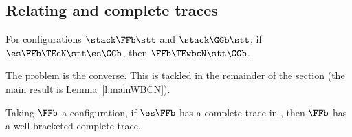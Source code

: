 \subsection{Relating \WBOGS and \AOGS complete traces}
\label{ss:main_wbct}

\ifcutLMCS


\begin{lemma}
\label{l:FFbFF}
For  configurations $\stack \FFb \stt$ and $\stack \GGb \stt$, if 
$ \es\FFb  \TEcN  \stt  \es\GGb$,  then $
\FFb  \TEwbcN \stt \GGb$. 
\end{lemma} 

The problem is the converse. 
This is tackled in the remainder of the section 
(the main result is Lemma~\ref{l:mainWBCN}).
\fi
             
\begin{lemma}
\label{l:TCtoWB}
Taking $\FFb$ a \WBOGS configuration,
if $\es\FFb$ has a complete trace in \AOGS, 
then $\FFb$ has a well-bracketed complete trace. 
\end{lemma} 



